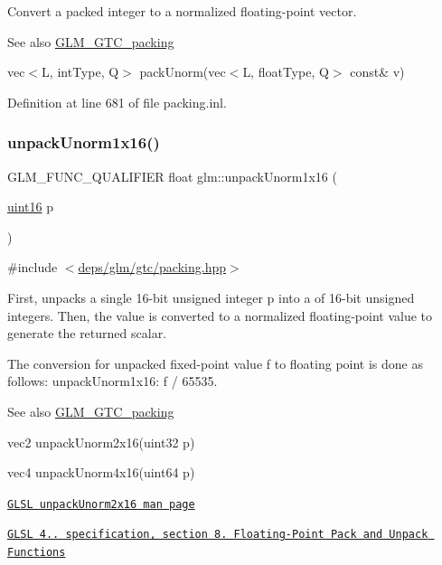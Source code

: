 Convert a packed integer to a normalized floating-\/point vector.

\begin{DoxySeeAlso}{See also}
\hyperlink{group__gtc__packing}{G\+L\+M\+\_\+\+G\+T\+C\+\_\+packing} 

vec$<$\+L, int\+Type, Q$>$ pack\+Unorm(vec$<$\+L, float\+Type, Q$>$ const\& v) 
\end{DoxySeeAlso}


Definition at line 681 of file packing.\+inl.

\mbox{\label{group__gtc__packing_ga7770e3ade4f4764cc1b2eb42ac4ec188}} 
\subsubsection{\texorpdfstring{unpack\+Unorm1x16()}{unpackUnorm1x16()}}
{\footnotesize\ttfamily G\+L\+M\+\_\+\+F\+U\+N\+C\+\_\+\+Q\+U\+A\+L\+I\+F\+I\+ER float glm\+::unpack\+Unorm1x16 (\begin{DoxyParamCaption}\item[{\hyperlink{group__gtc__type__precision_gad8c2939e1fdd8e5828b31d95c52255d5}{uint16}}]{p }\end{DoxyParamCaption})}



{\ttfamily \#include $<$\hyperlink{gtc_2packing_8hpp}{deps/glm/gtc/packing.\+hpp}$>$}

First, unpacks a single 16-\/bit unsigned integer p into a of 16-\/bit unsigned integers. Then, the value is converted to a normalized floating-\/point value to generate the returned scalar.

The conversion for unpacked fixed-\/point value f to floating point is done as follows\+: unpack\+Unorm1x16\+: f / 65535.

\begin{DoxySeeAlso}{See also}
\hyperlink{group__gtc__packing}{G\+L\+M\+\_\+\+G\+T\+C\+\_\+packing} 

vec2 unpack\+Unorm2x16(uint32 p) 

vec4 unpack\+Unorm4x16(uint64 p) 

\href{http://www.opengl.org/sdk/docs/manglsl/xhtml/unpackUnorm2x16.xml}{\tt G\+L\+SL unpack\+Unorm2x16 man page} 

\href{http://www.opengl.org/registry/doc/GLSLangSpec.4.20.8.pdf}{\tt G\+L\+SL 4.. specification, section 8. Floating-\/\+Point Pack and Unpack Functions} 
\end{DoxySeeAlso}


